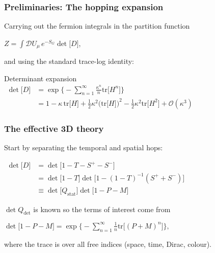 \documentclass[10pt,a4paper,usenames,dvipsnames]{beamer}
\newcommand{\tr}{\mathrm{tr}}
\begin{document}
\begin{frame}
  \frametitle{Preliminaries: The hopping expansion}

  Carrying out the fermion integrals in the partition function
  \begin{block}{}
    \centering
    $Z = \displaystyle\int \mathcal{D} U_{\mu} \, e^{-S_G} \det \big[ D \big]$,
  \end{block}

  \vspace{0.5em}

  and using the standard trace-log identity:
  
  \begin{block}{Determinant expansion}
    \centering
    $\begin{aligned}
      \det \big[ D \big] &= \exp \bigg\{ -\displaystyle\sum_{n=1}^{\infty} \frac{\kappa^n}{n} \tr \big[ H^n \big] \bigg\} \\
      &= 1 - \kappa \, \tr \big[ H \big] + \frac{1}{2} \kappa^2 \Big( \tr \big[ H \big] \Big)^2 - \frac{1}{2} \kappa^2 \tr \big[ H^2
      \big] + \mathcal{O}(\kappa^3)
    \end{aligned}$
  \end{block}

\end{frame}

\begin{frame}
  \frametitle{The effective 3D theory}

  Start by separating the temporal and spatial hops:

  \begin{block}{}
    \centering
    $\begin{aligned}
      \det \big[ D \big] &= \det \big[ 1 - T - S^+ - S^- \big] \\
      &= \det \big[ 1 - T \big] \det \big[ 1 - (1 - T)^{-1}(S^+ + S^-) \big] \\
      &\equiv \det \big[ Q_{\mathrm{stat}} \big] \det \big[ 1 - P - M \big]
    \end{aligned}$
  \end{block}

  $\det Q_{\mathrm{det}}$ is known so the terms of interest come from

  \begin{block}{}
    \centering
    $\det \big[ 1 - P - M \big] = \exp \bigg\{ - \displaystyle\sum_{n=1}^{\infty} \frac{1}{n} \tr \big[ (P + M)^n
    \big] \bigg\},$
  \end{block}
  where the trace is over all free indices (space, time, Dirac, colour).

\end{frame}
\end{document}
